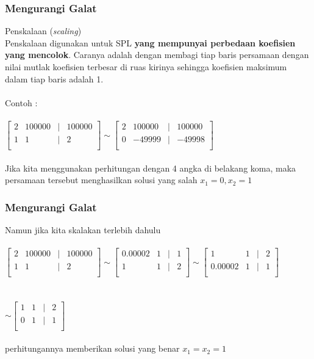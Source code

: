 \documentclass{beamer}
\begin{document}
\begin{frame}
\frametitle{Mengurangi Galat}
Penskalaan (\textit{scaling})
\\Penskalaan digunakan untuk SPL \textbf{yang mempunyai perbedaan koefisien yang mencolok}. Caranya adalah dengan membagi tiap baris persamaan dengan nilai mutlak koefisien terbesar di ruas kirinya sehingga koefisien maksimum dalam tiap baris adalah 1.
\\\ \\Contoh :
\\\ \\$\begin{bmatrix}
	2 & 100000 & | & 100000\\
	1 & 1 & | & 2\\
\end{bmatrix} \sim \begin{bmatrix}
	2 & 100000 & | & 100000\\
	0 & -49999 & | & -49998\\
\end{bmatrix}$
\\\ \\Jika kita menggunakan perhitungan dengan 4 angka di belakang koma, maka persamaan tersebut menghasilkan solusi yang salah $x_1=0, x_2=1$
\end{frame}


\begin{frame}
\frametitle{Mengurangi Galat}
Namun jika kita skalakan terlebih dahulu
\\\ \\$\begin{bmatrix}
	2 & 100000 & | & 100000\\
	1 & 1 & | & 2\\
\end{bmatrix}\sim \begin{bmatrix}
	0.00002 & 1 & | & 1\\
	1 & 1 & | & 2\\
\end{bmatrix}\sim \begin{bmatrix}
	1 & 1 & | & 2\\
	0.00002 & 1 & | & 1\\
\end{bmatrix}$
\\\ \\\ \\$\sim \begin{bmatrix}
	1 & 1 & | & 2\\
	0 & 1 & | & 1\\
\end{bmatrix}$
\\\ \\perhitungannya memberikan solusi yang benar $x_1=x_2=1$
\end{frame}
\end{document}
